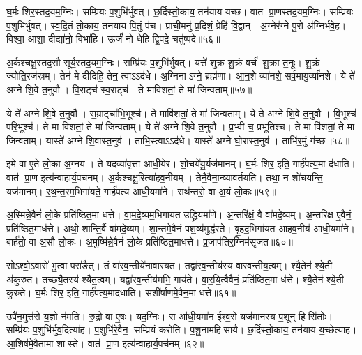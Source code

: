 घ॒र्मः शिर॒स्तद॒यम॒ग्निः।
सम्प्रि॑यः प॒शुभि॑र्भुवत्।
छ॒र्दिस्तो॒काय॒ तन॑याय यच्छ।
वात॑ प्रा॒णस्तद॒यम॒ग्निः।
सम्प्रि॑यः प॒शुभि॑र्भुवत्।
स्व॒दि॒तं तो॒काय॒ तन॑याय पि॒तुं प॑च।
प्राची॒मनु॑ प्र॒दिशं॒ प्रेहि॑ वि॒द्वान्।
अ॒ग्नेर॑ग्ने पु॒रो अ॑ग्निर्भवे॒ह।
विश्वा॒ आशा॒ दीद्या॑नो॒ विभा॑हि।
ऊर्जं॑ नो धेहि द्वि॒पदे॒ चतु॑ष्पदे॥५६॥

अ॒र्कश्चक्षु॒स्तद॒सौ सूर्य॒स्तद॒यम॒ग्निः।
सम्प्रि॑यः प॒शुभि॑र्भुवत्।
यत्ते॑ शुक्र शु॒क्रं वर्च॑ शु॒क्रा त॒नूः।
शु॒क्रं ज्योति॒रज॑स्रम्।
तेन॑ मे दीदिहि॒ तेन॒ त्वाऽऽद॑धे।
अ॒ग्निनाऽग्ने॒ ब्रह्म॑णा।
आ॒न॒शे व्या॑नशे॒ सर्व॒मायु॒र्व्या॑नशे।
ये ते॑ अग्ने शि॒वे त॒नुवौ।
वि॒राट्च॑ स्व॒राट्च॑।
ते मावि॑शतां॒ ते मा॑ जिन्वताम्॥५७॥

ये ते॑ अग्ने शि॒वे त॒नुवौ।
स॒म्राट्चा॑भि॒भूश्च॑।
ते मावि॑शतां॒ ते मा॑ जिन्वताम्।
ये ते॑ अग्ने शि॒वे त॒नुवौ।
वि॒भूश्च॑ परि॒भूश्च॑।
ते मा वि॑शतां॒ ते मा॑ जिन्वताम्।
ये ते॑ अग्ने शि॒वे त॒नुवौ।
प्र॒भ्वी च॒ प्रभू॑तिश्च।
ते मा वि॑शतां॒ ते मा॑ जिन्वताम्।
यास्ते॑ अग्ने शि॒वास्त॒नुव॑।
ताभि॒स्त्वाऽऽद॑धे।
यास्ते॑ अग्ने घो॒रास्त॒नुव॑।
ताभि॑र॒मुं ग॑च्छ॥५८॥\anuvakamend[चतु॑ष्पदे जिन्वतां त॒नुव॒स्त्रीणि॑ च]

इ॒मे वा ए॒ते लो॒का अ॒ग्नय॑।
ते यदव्या॑वृत्ता आधी॒येर\sn{}।
शो॒चये॑यु॒र्यज॑मानम्।
घ॒र्मः शिर॒ इति॒ गार्\mbox{}ह॑पत्य॒मा द॑धाति।
वात॑ प्रा॒ण इत्य॑न्वाहार्य॒पच॑नम्।
अ॒र्कश्चक्षु॒रित्या॑हव॒नीयम्।
तेनै॒वैना॒न्व्याव॑र्तयति।
तथा॒ न शो॑चयन्ति॒ यज॑मानम्।
र॒थ॒न्त॒रम॒भिगा॑यते॒ गार्\mbox{}ह॑पत्य आधी॒यमा॑ने।
राथ॑न्तरो॒ वा अ॒यं लो॒कः॥५९॥

अ॒स्मिन्ने॒वैनं॑ लो॒के प्रति॑ष्ठित॒मा ध॑त्ते।
वा॒म॒दे॒व्यम॒भिगा॑यत उद्ध्रि॒यमा॑णे।
अ॒न्तरि॑क्षं॒ वै वा॑मदे॒व्यम्।
अ॒न्तरि॑क्ष ए॒वैनं॒ प्रति॑ष्ठित॒माध॑त्ते।
अथो॒ शान्ति॒र्वै वा॑मदे॒व्यम्।
शा॒न्तमे॒वैनं॑ पश॒व्य॑मुद्ध॑रते।
बृ॒हद॒भिगा॑यत आहव॒नीय॑ आधी॒यमा॑ने।
बार्\mbox{}ह॑तो॒ वा अ॒सौ लो॒कः।
अ॒मुष्मि॑न्ने॒वैनं॑ लो॒के प्रति॑ष्ठित॒माध॑त्ते।
प्र॒जाप॑तिर॒ग्निम॑सृजत॥६०॥

सोऽश्वो॒ऽवारो॑ भू॒त्वा परा॑ङैत्।
तं वा॑रव॒न्तीये॑नावारयत।
तद्वा॑रव॒न्तीय॑स्य वारवन्तीय॒त्वम्।
श्यै॒तेन॑ श्ये॒ती अ॑कुरुत।
तच्छ्यै॒तस्य॑ श्यैत॒त्वम्।
यद्वा॑रव॒न्तीय॑मभि॒ गाय॑ते।
वा॒र॒यि॒त्वैवैनं॒ प्रति॑ष्ठित॒मा ध॑त्ते।
श्यै॒तेन॑ श्ये॒ती कु॑रुते।
घ॒र्मः शिर॒ इति॒ गार्\mbox{}ह॑पत्य॒माद॑धाति।
सशी॑र्\mbox{}षाणमे॒वैन॒मा ध॑त्ते॥६१॥

उपै॑न॒मुत्त॑रो य॒ज्ञो न॑मति।
रु॒द्रो वा ए॒षः।
यद॒ग्निः।
स आ॑धी॒यमा॑न ईश्व॒रो यज॑मानस्य प॒शून् हिसि॑तोः।
सम्प्रि॑यः प॒शुभि॑र्भुव॒दित्या॑ह।
प॒शुभि॑रे॒वैन॒ सम्प्रि॑यं करोति।
प॒शू॒नामहिसायै।
छ॒र्दिस्तो॒काय॒ तन॑याय य॒च्छेत्या॑ह।
आ॒शिष॑मे॒वैतामा शास्ते।
वात॑ प्रा॒ण इत्य॑न्वाहार्य॒पच॑नम्॥६२॥

